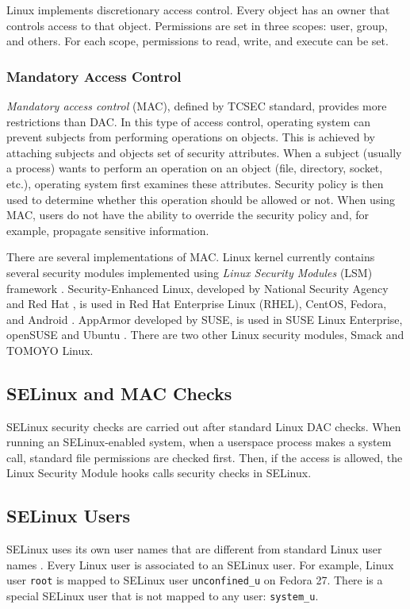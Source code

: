 Linux implements discretionary access control. Every object has an owner that
controls access to that object. Permissions are set in three scopes: user,
group, and others. For each scope, permissions to read, write, and execute can
be set.

\subsubsection{Mandatory Access Control}
\emph{Mandatory access control} (MAC), defined by TCSEC standard, provides more
restrictions than DAC. In this type of access control, operating system can
prevent subjects from performing operations on objects. This is achieved by
attaching subjects and objects set of security attributes. When a subject
(usually a process) wants to perform an operation on an object (file, directory,
socket, etc.), operating system first examines these attributes. Security
policy is then used to determine whether this operation should be allowed or
not. When using MAC, users do not have the ability to override the security
policy and, for example, propagate sensitive information.

There are several implementations of MAC. Linux kernel currently contains
several security modules implemented using \emph{Linux Security Modules} (LSM)
framework \cite{lsmusage}. Security-Enhanced Linux, developed by National
Security Agency and Red Hat \cite{selinuxcontr}, is used in Red Hat Enterprise
Linux (RHEL), CentOS, Fedora, and Android
\cite{selinuxguide,selinuxguidefedora,selinuxandroid}. AppArmor developed by
SUSE, is used in SUSE Linux Enterprise, openSUSE and Ubuntu
\cite{apparmor,apparmorubuntu}. There are two other Linux security modules,
Smack and TOMOYO Linux.

\subsection{SELinux and MAC Checks}
SELinux security checks are carried out after standard Linux DAC checks. When
running an SELinux-enabled system, when a userspace process makes a system call,
standard file permissions are checked first. Then, if the access is allowed, the
Linux Security Module hooks calls security checks in SELinux.

\subsection{SELinux Users}
\label{selinuxuser}
SELinux uses its own user names that are different from standard Linux user
names \cite[p.~24]{tsn}. Every Linux user is associated to an SELinux user. For
example, Linux user \texttt{root} is mapped to SELinux user
\texttt{unconfined\_u} on Fedora 27. There is a special SELinux user that is
not mapped to any user: \texttt{system\_u}.

